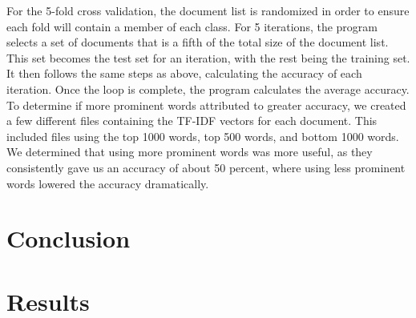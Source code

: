 \documentclass[12pt]{article}
\begin{document}
\indent For the 5-fold cross validation, the document list is randomized in order to ensure each fold will contain a member of each class. For 5 iterations, the program selects a set of documents that is a fifth of the total size of the document list. This set becomes the test set for an iteration, with the rest being the training set. It then follows the same steps as above, calculating the accuracy of each iteration. Once the loop is complete, the program calculates the average accuracy.\\
\indent To determine if more prominent words attributed to greater accuracy, we created a few different files containing the TF-IDF vectors for each document. This included files using the top 1000 words, top 500 words, and bottom 1000 words. We determined that using more prominent words was more useful, as they consistently gave us an accuracy of about 50 percent, where using less prominent words lowered the accuracy dramatically.\\

\section{Conclusion}

\section{Results}


\begin{thebibliography}{9}


\end{thebibliography}
\end{document}
